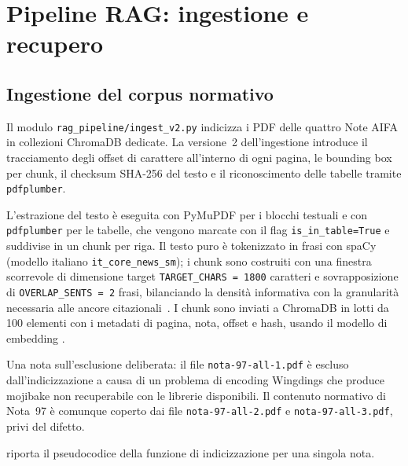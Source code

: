 \section{Pipeline RAG: ingestione e recupero}
\label{sec:rag-impl}

\subsection{Ingestione del corpus normativo}

Il modulo \texttt{rag\_pipeline/ingest\_v2.py} indicizza i PDF delle quattro
Note AIFA in collezioni ChromaDB dedicate. La versione~2 dell'ingestione
introduce il tracciamento degli offset di carattere all'interno di ogni
pagina, le bounding box per chunk, il checksum SHA-256 del testo e il
riconoscimento delle tabelle tramite \texttt{pdfplumber}.

L'estrazione del testo è eseguita con PyMuPDF per i blocchi testuali e con
\texttt{pdfplumber} per le tabelle, che vengono marcate con il flag
\texttt{is\_in\_table=True} e suddivise in un chunk per riga. Il testo puro è
tokenizzato in frasi con spaCy (modello italiano \texttt{it\_core\_news\_sm});
i chunk sono costruiti con una finestra scorrevole di dimensione target
\texttt{TARGET\_CHARS = 1800} caratteri e sovrapposizione di
\texttt{OVERLAP\_SENTS = 2} frasi, bilanciando la densità informativa con la
granularità necessaria alle ancore citazionali~\cite{gao2023ragsurvey}. I
chunk sono inviati a ChromaDB in lotti da 100 elementi con i metadati di
pagina, nota, offset e hash, usando il modello di embedding \embedmodel.

Una nota sull'esclusione deliberata: il file \texttt{nota-97-all-1.pdf} è
escluso dall'indicizzazione a causa di un problema di encoding Wingdings che
produce mojibake non recuperabile con le librerie disponibili. Il contenuto
normativo di Nota~97 è comunque coperto dai file \texttt{nota-97-all-2.pdf}
e \texttt{nota-97-all-3.pdf}, privi del difetto.

 riporta il pseudocodice della funzione di indicizzazione
per una singola nota.

